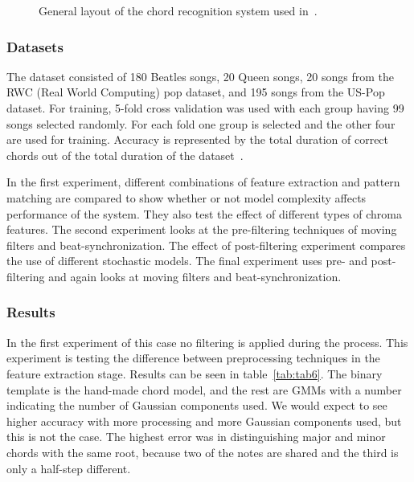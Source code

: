 \documentclass{sig-alternate}
\begin{document}
\begin{figure}
\centering
{}
\caption{General layout of the chord recognition system used in~\cite{TaeMin:2014}.}
\label{fig:fig3}
\end{figure}

\subsubsection{Datasets}

The dataset consisted of 180 Beatles songs, 20 Queen songs, 20 songs from the RWC (Real World Computing) pop dataset, and 195 songs from the US-Pop dataset. For training, 5-fold cross validation was used with each group having 99 songs selected randomly. For each fold one group is selected and the other four are used for training. Accuracy is represented by the total duration of correct chords out of the total duration of the dataset~\cite{TaeMin:2014}.

In the first experiment, different combinations of feature extraction and pattern matching are compared to show whether or not model complexity affects performance of the system. They also test the effect of different types of chroma features. The second experiment looks at the pre-filtering techniques of moving filters and beat-synchronization.  The effect of post-filtering experiment compares the use of different stochastic models. The final experiment uses pre- and post-filtering and again looks at moving filters and beat-synchronization.


\subsubsection{Results}

In the first experiment of this case no filtering is applied during the process. This experiment is testing the difference between preprocessing techniques in the feature extraction stage. Results can be seen in table~\ref{tab:tab6}. The binary template is the hand-made chord model, and the rest are GMMs with a number indicating the number of Gaussian components used. We would expect to see higher accuracy with more processing and more Gaussian components used, but this is not the case. The highest error was in distinguishing major and minor chords with the same root, because two of the notes are shared and the third is only a half-step different.
\end{document}
